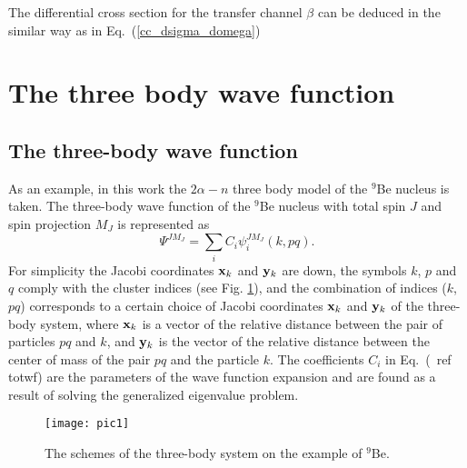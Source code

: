 \documentclass[
12pt, %
oneside, %
english, %
onehalfspacing, %
headsepline, %
]{MastersDoctoralThesis} %
\begin{document}
The differential cross section for the transfer channel $\beta$ can be deduced in the similar way as in Eq.~(\ref{cc_dsigma_domega})


\section{The three body wave function}
\subsection{The three-body wave function}

As an example, in this work the $2\alpha-n$ three body model of the $^9$Be nucleus is taken. The three-body wave function of the $^9$Be nucleus with total spin $ J $ and spin projection $ M_J $ is represented as
 \begin{equation}
 \Psi^{JM_J}= \sum_{i} C_{i} \psi_{i}^{JM_J} \left( k,pq \right).
 \label{totwf}
 \end{equation}
For simplicity the Jacobi coordinates $ {\bf x}_k $ and $ {\bf y}_k $ are down, the symbols $ k $, $ p $ and $ q $ comply with the cluster indices (see Fig. \ref{fig:jacobiSet}), and the combination of indices ($ k $, $ pq $) corresponds to a certain choice of Jacobi coordinates $ {\bf x}_k $ and $ {\bf y}_k $ of the three-body system, where $ {\bf x}_k $ is a vector of the relative distance between the pair of particles $ pq $ and $ k $, and $ {\bf y}_k $ is the vector of the relative distance between the center of mass of the pair $ pq $ and the particle $ k $. 
The coefficients $ C_{i} $ in Eq.~(\ ref {totwf}) are the parameters of the wave function expansion and are found as a result of solving the generalized eigenvalue problem. 

\begin{figure}[b]
\centering
\texttt{[image: pic1]}\\
\caption{The schemes of the three-body system on the example of ${}^9$Be.}
\label{fig:jacobiSet}
\end{figure}
\end{document}
